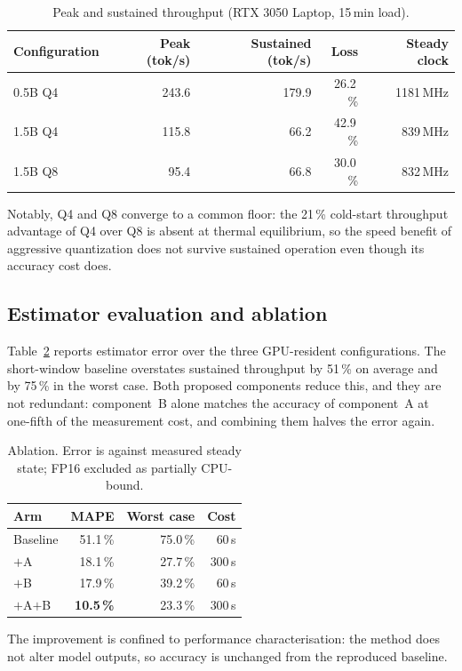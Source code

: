 \documentclass[11pt,a4paper]{article}
\begin{document}
\begin{table}[h]
\centering
\caption{Peak and sustained throughput (RTX 3050 Laptop, 15\,min load).}
\label{tab:sustained}
\begin{tabular}{lrrrr}
\toprule
Configuration & Peak (tok/s) & Sustained (tok/s) & Loss & Steady clock \\
\midrule
0.5B Q4 & 243.6 & 179.9 & 26.2\,\% & 1181\,MHz \\
1.5B Q4 & 115.8 &  66.2 & 42.9\,\% &  839\,MHz \\
1.5B Q8 &  95.4 &  66.8 & 30.0\,\% &  832\,MHz \\
\bottomrule
\end{tabular}
\end{table}

Notably, Q4 and Q8 converge to a common floor: the 21\,\% cold-start throughput
advantage of Q4 over Q8 is absent at thermal equilibrium, so the speed benefit
of aggressive quantization does not survive sustained operation even though its
accuracy cost does.

\subsection{Estimator evaluation and ablation}
Table~\ref{tab:ablation} reports estimator error over the three GPU-resident
configurations. The short-window baseline overstates sustained throughput by
51\,\% on average and by 75\,\% in the worst case. Both proposed components
reduce this, and they are not redundant: component~B alone matches the accuracy
of component~A at one-fifth of the measurement cost, and combining them halves
the error again.

\begin{table}[h]
\centering
\caption{Ablation. Error is against measured steady state; FP16 excluded as
partially CPU-bound.}
\label{tab:ablation}
\begin{tabular}{lrrr}
\toprule
Arm & MAPE & Worst case & Cost \\
\midrule
Baseline & 51.1\,\% & 75.0\,\% &  60\,s \\
$+$A     & 18.1\,\% & 27.7\,\% & 300\,s \\
$+$B     & 17.9\,\% & 39.2\,\% &  60\,s \\
$+$A$+$B & \textbf{10.5\,\%} & 23.3\,\% & 300\,s \\
\bottomrule
\end{tabular}
\end{table}

The improvement is confined to performance characterisation: the method does
not alter model outputs, so accuracy is unchanged from the reproduced baseline.
\end{document}

